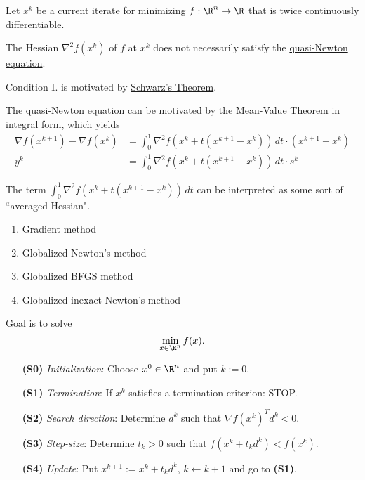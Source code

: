 Let $x^k$ be a current iterate for minimizing $f:\R^n\to\R$ that is twice
continuously differentiable.
\begin{enumerata}
  \item The Hessian $\nabla^2f(x^k)$ of $f$ at $x^k$ does not necessarily
        satisfy the \href{cc538a4}{quasi-Newton equation}.
  \item Condition I. is motivated by \href{c3524e9}{Schwarz's Theorem}.
  \item The quasi-Newton equation can be motivated by the Mean-Value Theorem in
        integral form, which yields
  \begin{align*}
    \nabla f(x^{k+1})-\nabla f(x^k)
        &=\int_0^1\nabla^2f(x^k+t(x^{k+1}-x^k))\,dt\cdot(x^{k+1}-x^k) \\
    y^k &=\int_0^1\nabla^2f(x^k+t(x^{k+1}-x^k))\,dt\cdot s^k
  \end{align*}

  The term $\int_0^1\nabla^2f(x^k+t(x^{k+1}-x^k))\,dt$ can be interpreted as
  some sort of ``averaged Hessian".
\end{enumerata}

\label{a75d03d}

\begin{enumerate}
  \item Gradient method
  \item Globalized Newton's method
  \item Globalized BFGS method
  \item Globalized inexact Newton's method
\end{enumerate}

\label{edbf62c}

Goal is to solve
$$
  \min_{x\in\R^n}f(x).
$$

\begin{enumerate}
  \item [\textbf{(S0)}] \textit{Initialization}: Choose $x^0\in\R^n$ and put $k:=0$.
  \item [\textbf{(S1)}] \textit{Termination}: If $x^k$ satisfies a termination criterion: STOP.
  \item [\textbf{(S2)}] \textit{Search direction}: Determine $d^k$ such that $\nabla f(x^k)^Td^k<0$.
  \item [\textbf{(S3)}] \textit{Step-size}: Determine $t_k>0$ such that $f(x^k+t_kd^k)<f(x^k)$.
  \item [\textbf{(S4)}] \textit{Update}: Put $x^{k+1}:=x^k+t_kd^k$, $k\gets k+1$ and go to \textbf{(S1)}.
\end{enumerate}

